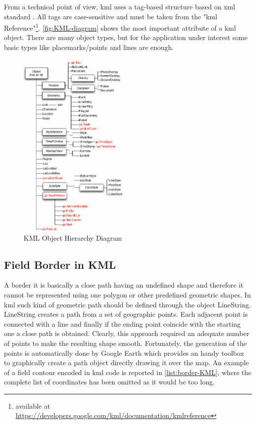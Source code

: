 From a technical point of view, \acrshort{kml} uses a tag-based structure based on \acrshort{xml} standard \cite{bray06xml11}. All tags are case-sensitive and must be taken from the "\acrshort{kml} Reference"\footnote{available at \url{https://developers.google.com/kml/documentation/kmlreference}}. \autoref{fig:KML-diagram} shows the most important attribute of a \acrshort{kml} object. There are many object types, but for the application under interest some basic types like placemarks/points and lines are enough.
\begin{figure}[ht]
    \centering
    \includegraphics[width=0.5\textwidth]{figures/C2/KML-classTree.png}
    \caption{KML Object Hierarchy Diagram}
    \label{fig:KML-diagram}
\end{figure}


\subsection{Field Border in KML} %
\label{sub:field_border_in_kml}
A border it is basically a close path having an undefined shape and therefore it cannot be represented using one polygon or other predefined geometric shapes. In \acrshort{kml} such kind of geometric path should be defined through the object \textsf{LineString}. \textsf{LineString} creates a path from a set of geographic points. Each adjacent point is connected with a line and finally if the ending point coincide with the starting one a close path is obtained. Clearly, this approach required an adequate number of points to make the resulting shape smooth. Fortunately, the generation of the points is automatically done by Google Earth which provides an handy toolbox to graphically create a path object directly drawing it over the map.
An example of a field contour encoded in \acrshort{kml} code is reported in \autoref{list:border-KML}, where the complete list of coordinates has been omitted as it would be too long.


